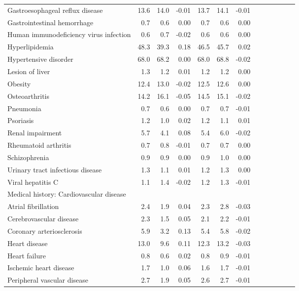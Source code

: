 \documentclass[11pt,]{article}
\begin{document}
\begin{longtable}{lrrrrrrrrrrrr}
      Gastroesophageal reflux disease & 13.6 & 14.0 & -0.01 & 13.7 & 14.1 & -0.01 \\ 
      Gastrointestinal hemorrhage &  0.7 &  0.6 &  0.00 &  0.7 &  0.6 &  0.00 \\ 
      Human immunodeficiency virus infection &  0.6 &  0.7 & -0.02 &  0.6 &  0.6 &  0.00 \\ 
      Hyperlipidemia & 48.3 & 39.3 &  0.18 & 46.5 & 45.7 &  0.02 \\ 
      Hypertensive disorder & 68.0 & 68.2 &  0.00 & 68.0 & 68.8 & -0.02 \\ 
      Lesion of liver &  1.3 &  1.2 &  0.01 &  1.2 &  1.2 &  0.00 \\ 
      Obesity & 12.4 & 13.0 & -0.02 & 12.5 & 12.6 &  0.00 \\ 
      Osteoarthritis & 14.2 & 16.1 & -0.05 & 14.5 & 15.1 & -0.02 \\ 
      Pneumonia &  0.7 &  0.6 &  0.00 &  0.7 &  0.7 & -0.01 \\ 
      Psoriasis &  1.2 &  1.0 &  0.02 &  1.2 &  1.1 &  0.01 \\ 
      Renal impairment &  5.7 &  4.1 &  0.08 &  5.4 &  6.0 & -0.02 \\ 
      Rheumatoid arthritis &  0.7 &  0.8 & -0.01 &  0.7 &  0.7 &  0.00 \\ 
      Schizophrenia &  0.9 &  0.9 &  0.00 &  0.9 &  1.0 &  0.00 \\ 
      Urinary tract infectious disease &  1.3 &  1.1 &  0.01 &  1.2 &  1.3 &  0.00 \\ 
      Viral hepatitis C &  1.1 &  1.4 & -0.02 &  1.2 &  1.3 & -0.01 \\ 
  Medical history: Cardiovascular disease &    &    &     &    &    &     \\ 
      Atrial fibrillation &  2.4 &  1.9 &  0.04 &  2.3 &  2.8 & -0.03 \\ 
      Cerebrovascular disease &  2.3 &  1.5 &  0.05 &  2.1 &  2.2 & -0.01 \\ 
      Coronary arteriosclerosis &  5.9 &  3.2 &  0.13 &  5.4 &  5.8 & -0.02 \\ 
      Heart disease & 13.0 &  9.6 &  0.11 & 12.3 & 13.2 & -0.03 \\ 
      Heart failure &  0.8 &  0.6 &  0.02 &  0.8 &  0.9 & -0.01 \\ 
      Ischemic heart disease &  1.7 &  1.0 &  0.06 &  1.6 &  1.7 & -0.01 \\ 
      Peripheral vascular disease &  2.7 &  1.9 &  0.05 &  2.6 &  2.7 & -0.01 \\ 

\end{longtable}
\end{document}
